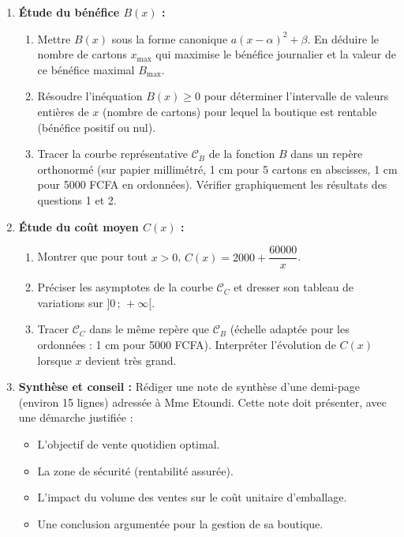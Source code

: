 \documentclass[11pt]{article}
\begin{document}
\begin{enumerate}
    \item \textbf{Étude du bénéfice $B(x)$ :}
    \begin{enumerate}
        \item Mettre $B(x)$ sous la forme canonique $a(x-\alpha)^2 + \beta$. En déduire le nombre de cartons $x_{\text{max}}$ qui maximise le bénéfice journalier et la valeur de ce bénéfice maximal $B_{\text{max}}$.
        \item Résoudre l'inéquation $B(x) \ge 0$ pour déterminer l'intervalle de valeurs entières de $x$ (nombre de cartons) pour lequel la boutique est rentable (bénéfice positif ou nul).
        \item Tracer la courbe représentative $\mathcal{C}_B$ de la fonction $B$ dans un repère orthonormé (sur papier millimétré, 1 cm pour 5 cartons en abscisses, 1 cm pour 5000 FCFA en ordonnées). Vérifier graphiquement les résultats des questions 1 et 2.
    \end{enumerate}
    \item \textbf{Étude du coût moyen $C(x)$ :}
    \begin{enumerate}
        \item Montrer que pour tout $x > 0$, $C(x) = 2000 + \dfrac{60000}{x}$.
        \item Préciser les asymptotes de la courbe $\mathcal{C}_C$ et dresser son tableau de variations sur $]0\,;\, +\infty[$.
        \item Tracer $\mathcal{C}_C$ dans le même repère que $\mathcal{C}_B$ (échelle adaptée pour les ordonnées : 1 cm pour 5000 FCFA). Interpréter l'évolution de $C(x)$ lorsque $x$ devient très grand.
    \end{enumerate}
    \item \textbf{Synthèse et conseil :} Rédiger une note de synthèse d'une demi-page (environ 15 lignes) adressée à Mme Etoundi. Cette note doit présenter, avec une démarche justifiée :
    \begin{itemize}
        \item L'objectif de vente quotidien optimal.
        \item La zone de sécurité (rentabilité assurée).
        \item L'impact du volume des ventes sur le coût unitaire d'emballage.
        \item Une conclusion argumentée pour la gestion de sa boutique.
    \end{itemize}
\end{enumerate}
\end{document}
